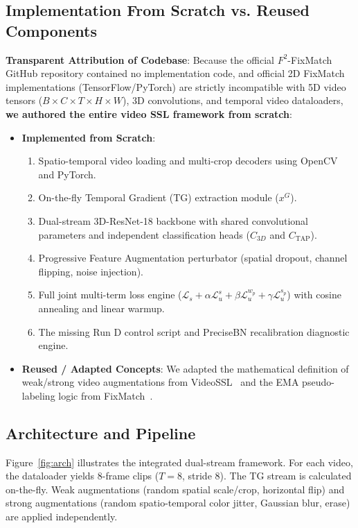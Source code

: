 \documentclass[10pt,twocolumn,a4paper]{article}
\begin{document}
\subsection{Implementation From Scratch vs. Reused Components}
\label{sec:impl_audit}
\textbf{Transparent Attribution of Codebase}:
Because the official $F^2$-FixMatch GitHub repository contained no implementation code, and official 2D FixMatch implementations (TensorFlow/PyTorch) are strictly incompatible with 5D video tensors ($B \times C \times T \times H \times W$), 3D convolutions, and temporal video dataloaders, \textbf{we authored the entire video SSL framework from scratch}:
\begin{itemize}
    \item \textbf{Implemented from Scratch}:
    \begin{enumerate}
        \item Spatio-temporal video loading and multi-crop decoders using OpenCV and PyTorch.
        \item On-the-fly Temporal Gradient (TG) extraction module ($x^G$).
        \item Dual-stream 3D-ResNet-18 backbone with shared convolutional parameters and independent classification heads ($C_{3D}$ and $C_{\text{TAP}}$).
        \item Progressive Feature Augmentation perturbator (spatial dropout, channel flipping, noise injection).
        \item Full joint multi-term loss engine ($\mathcal{L}_s + \alpha \mathcal{L}_u^s + \beta \mathcal{L}_u^{w_p} + \gamma \mathcal{L}_u^{s_p}$) with cosine annealing and linear warmup.
        \item The missing Run D control script and PreciseBN recalibration diagnostic engine.
    \end{enumerate}
    \item \textbf{Reused / Adapted Concepts}:
    We adapted the mathematical definition of weak/strong video augmentations from VideoSSL~\cite{xiao2021videossl} and the EMA pseudo-labeling logic from FixMatch~\cite{sohn2020fixmatch}.
\end{itemize}

\subsection{Architecture and Pipeline}
Figure~\ref{fig:arch} illustrates the integrated dual-stream framework. For each video, the dataloader yields 8-frame clips ($T=8$, stride 8). The TG stream is calculated on-the-fly. Weak augmentations (random spatial scale/crop, horizontal flip) and strong augmentations (random spatio-temporal color jitter, Gaussian blur, erase) are applied independently.
\end{document}
